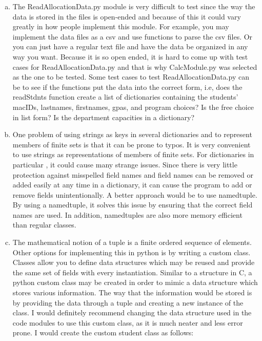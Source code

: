 \documentclass[12pt]{article}
\begin{document}
\begin{enumerate}[(a)]
\item The ReadAllocationData.py module is very difficult to test since the way the data is stored in the files is open-ended and because of this it could vary greatly in how people implement this module. For example, you may implement the data files as a csv and use functions to parse the csv files. Or you can just have a regular text file and have the data be organized in any way you want. Because it is so open ended, it is hard to come up with test cases for ReadAllocationData.py and that is why CalcModule.py was selected as the one to be tested. Some test cases to test ReadAllocationData.py can be to see if the functions put the data into the correct form, i.e, does the readStdnts function create a list of dictionaries containing the students' macIDs, lastnames, firstnames, gpas, and program choices? Is the free choice in list form? Is the department capacities in a dictionary? 

\item One problem of using strings as keys in several dictionaries and to represent members of finite sets is that it can be prone to typos. It is very convenient to use strings as representations of members of finite sets. For dictionaries in particular , it could cause many strange issues. Since there is very little protection against misspelled field names and field names can be removed or added easily at any time in a dictionary, it can cause the program to add or remove fields unintentionally. A better approach would be to use namedtuple. By using a namedtuple, it solves this issue by ensuring that the correct field names are used. In addition, namedtuples are also more memory efficient than regular classes.

\item The mathematical notion of a tuple is a finite ordered sequence of elements. Other options for implementing this in python is by writing a custom class. Classes allow you to define data structures which may be reused and provide the same set of fields with every instantiation. Similar to a structure in C, a python custom class may be created in order to mimic a data structure which stores various information. The way that the information would be stored is by providing the data through a tuple and creating a new instance of the class. I would definitely recommend changing the data structure used in the code modules to use this custom class, as it is much neater and less error prone. I would create the custom student class as follows:


\end{enumerate}
\end{document}
